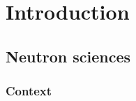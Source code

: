 
\section{Introduction}
\subsection{Neutron sciences}
\begin{frame}
  \frametitle{Context}
\end{frame}




